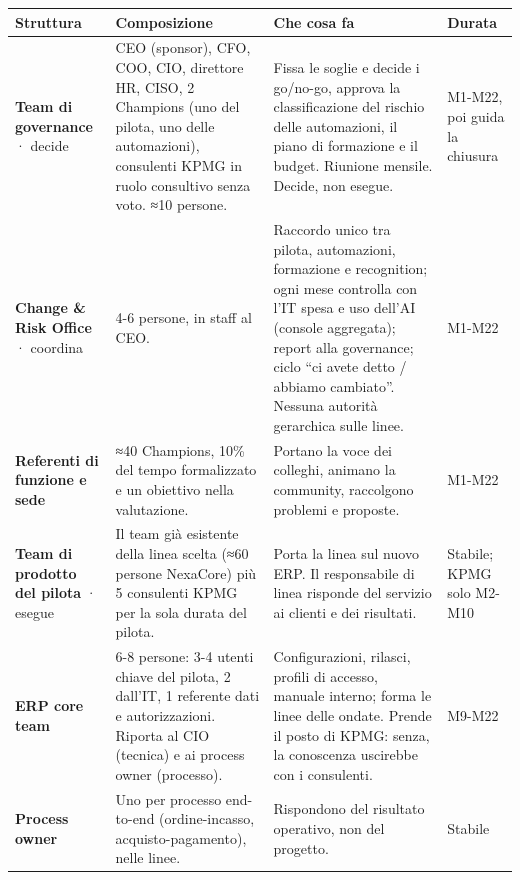 \documentclass[11pt,a4paper]{article}
\begin{document}
{\small\renewcommand{\arraystretch}{1.25}
\begin{xltabular}{\linewidth}{@{}>{\raggedright\arraybackslash{}\hsize\hspace{0pt}}X>{\raggedright\arraybackslash{}\hsize\hspace{0pt}}X>{\raggedright\arraybackslash{}\hsize\hspace{0pt}}X>{\raggedright\arraybackslash{}\hsize\hspace{0pt}}X@{}}
\toprule
\textbf{Struttura} & \textbf{Composizione} & \textbf{Che cosa fa} & \textbf{Durata} \\
\midrule
\endhead
\textbf{Team di governance} · decide & CEO (sponsor), CFO, COO, CIO, direttore HR, CISO, 2 Champions (uno del pilota, uno delle automazioni), consulenti KPMG in ruolo consultivo senza voto. ≈10 persone. & Fissa le soglie e decide i go/no-go, approva la classificazione del rischio delle automazioni, il piano di formazione e il budget. Riunione mensile. Decide, non esegue. & M1-M22, poi guida la chiusura \\
\textbf{Change \& Risk Office} · coordina & 4-6 persone, in staff al CEO. & Raccordo unico tra pilota, automazioni, formazione e recognition; ogni mese controlla con l'IT spesa e uso dell'AI (console aggregata); report alla governance; ciclo ``ci avete detto / abbiamo cambiato''. Nessuna autorità gerarchica sulle linee. & M1-M22 \\
\textbf{Referenti di funzione e sede} & ≈40 Champions, 10\% del tempo formalizzato e un obiettivo nella valutazione. & Portano la voce dei colleghi, animano la community, raccolgono problemi e proposte. & M1-M22 \\
\textbf{Team di prodotto del pilota} · esegue & Il team già esistente della linea scelta (≈60 persone NexaCore) più 5 consulenti KPMG per la sola durata del pilota. & Porta la linea sul nuovo ERP. Il responsabile di linea risponde del servizio ai clienti e dei risultati. & Stabile; KPMG solo M2-M10 \\
\textbf{ERP core team} & 6-8 persone: 3-4 utenti chiave del pilota, 2 dall'IT, 1 referente dati e autorizzazioni. Riporta al CIO (tecnica) e ai process owner (processo). & Configurazioni, rilasci, profili di accesso, manuale interno; forma le linee delle ondate. Prende il posto di KPMG: senza, la conoscenza uscirebbe con i consulenti. & M9-M22 \\
\textbf{Process owner} & Uno per processo end-to-end (ordine-incasso, acquisto-pagamento), nelle linee. & Rispondono del risultato operativo, non del progetto. & Stabile \\
\bottomrule
\end{xltabular}}
\end{document}
